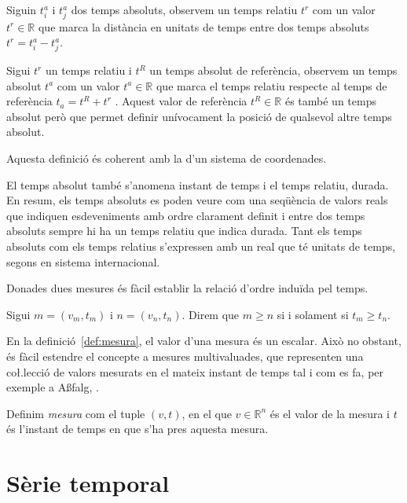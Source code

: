 \begin{definition}[Temps]
  \label{def:temps}
  Siguin $t^a_i$ i $t^a_j$ dos temps absoluts, observem un temps
  relatiu $t^r$ com un valor $t^r \in \mathbb{R}$ que marca la
  distància en unitats de temps entre dos temps absoluts $t^r = t^a_i
  - t^a_j$.
  
  Sigui $t^r$ un temps relatiu i $t^{R}$ un temps absolut de
  referència, observem un temps absolut $t^a$ com un valor $t^a
  \in\mathbb{R}$ que marca el temps relatiu respecte al temps de
  referència $t_a= t^{R} + t^r$ . Aquest valor de referència
  $t^{R}\in\mathbb{R}$ és també un temps absolut però que permet
  definir unívocament la posició de qualsevol altre temps absolut.

  Aquesta definició és coherent amb la d'un sistema de coordenades.
\end{definition}

El temps absolut també s'anomena instant de temps i el temps relatiu, durada.
En resum, els temps absoluts es poden veure com una seqüència de valors reals que indiquen esdeveniments amb ordre clarament definit i entre dos temps absoluts sempre hi ha un temps relatiu que indica durada. Tant els temps absoluts com els temps relatius s'expressen amb un real que té unitats de temps, segons en sistema internacional. 





Donades dues mesures és fàcil establir la relació d'ordre induïda pel
temps.

\begin{definition}
  \label{def:relacio-ordre}
  Sigui $m=(v_m,t_m)$ i $n=(v_n,t_n)$. Direm que $m\geq n$ si i solament
  si $t_m\geq t_n$.
\end{definition}

En la definició~\ref{def:mesura}, el valor d'una mesura és un
escalar. Això no obstant, és fàcil estendre el concepte a mesures
multivaluades, que representen una co\l.lecció de valors
mesurats en el mateix instant de temps tal i com es fa, per exemple a
A\ss falg, \cite{assfalg08:thesis}.

\begin{definition}
  Definim \emph{mesura} com el tuple $(v,t)$, en el que
  $v\in\mathbb{R}^n$ és el valor de la mesura i $t$ és l'instant de
  temps en que s'ha pres aquesta mesura.
\end{definition}



\section{Sèrie temporal}
\label{sec:model:serietemporal}

